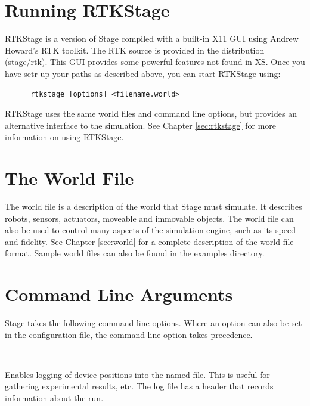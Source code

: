 \documentclass[11pt]{report}
\newenvironment{xarg}[1]{\noindent{\tt #1}\\\hspace*{2em}\begin{minipage}[t]{5in}}{\end{minipage}\vspace*{1em}}
\begin{document}
  
  \section{Running RTKStage}

    RTKStage is a version of Stage compiled with a built-in X11 GUI
    using Andrew Howard's RTK toolkit. The RTK source is provided in
    the distribution (stage/rtk). This GUI provides some powerful
    features not found in XS.  Once you have setr up your paths
    as described above, you can start RTKStage using:
      \begin{verbatim} 
      rtkstage [options] <filename.world> 
      \end{verbatim} 
    RTKStage uses the same world files and command line options,
    but provides an alternative interface to the simulation.
    See Chapter \ref{sec:rtkstage} for more information on using
    RTKStage.

  \section{The World File}

    The world file is a description of the world that Stage
    must simulate.  It describes robots, sensors, actuators,
    moveable and immovable objects.  The world file can also
    be used to control many aspects of the simulation engine,
    such as its speed and fidelity.  
    See Chapter \ref{sec:world} for a complete description of
    the world file format.  Sample world files can also be
    found in the examples directory.

  \section{Command Line Arguments}

    Stage takes the following command-line options. Where an option
    can also be set in the configuration file, the command line option
    takes precedence.

    \begin{xarg}{-l <logfile>}
    Enables logging of device positions into the named file. This is
    useful for gathering experimental results, etc. The log file has a
    header that records information about the run.
    \end{xarg}
\end{document}
